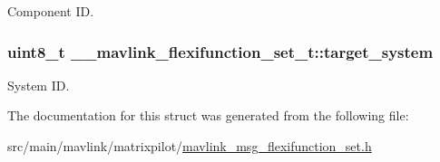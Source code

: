 Component I\+D. 

\hypertarget{struct____mavlink__flexifunction__set__t_ada52c792ba79268561b910c0eb669285}{
\subsubsection[{target\+\_\+system}]{\setlength{\rightskip}{0pt plus 5cm}uint8\+\_\+t \+\_\+\+\_\+mavlink\+\_\+flexifunction\+\_\+set\+\_\+t\+::target\+\_\+system}}\label{struct____mavlink__flexifunction__set__t_ada52c792ba79268561b910c0eb669285}


System I\+D. 



The documentation for this struct was generated from the following file\+:\begin{DoxyCompactItemize}
\item 
src/main/mavlink/matrixpilot/\hyperlink{mavlink__msg__flexifunction__set_8h}{mavlink\+\_\+msg\+\_\+flexifunction\+\_\+set.\+h}\end{DoxyCompactItemize}
